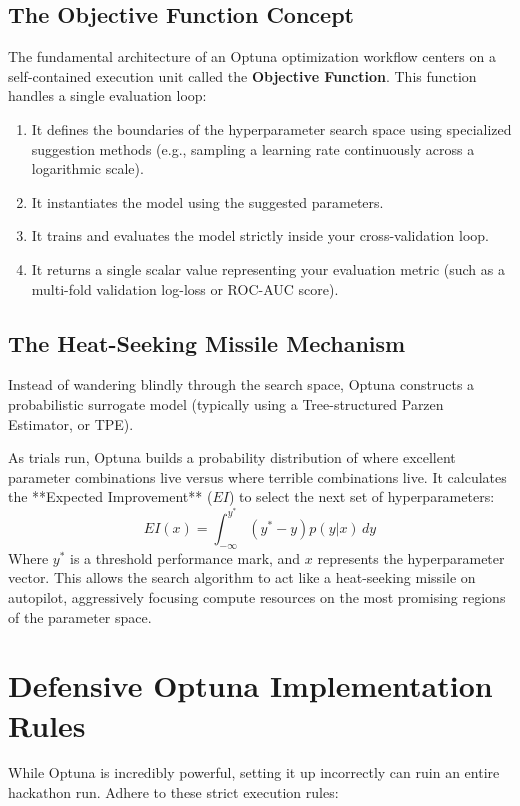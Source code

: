 \documentclass{article}
\begin{document}
\subsection{The Objective Function Concept}
The fundamental architecture of an Optuna optimization workflow centers on a self-contained execution unit called the \textbf{Objective Function}. This function handles a single evaluation loop:
\begin{enumerate}
    \item It defines the boundaries of the hyperparameter search space using specialized suggestion methods (e.g., sampling a learning rate continuously across a logarithmic scale).
    \item It instantiates the model using the suggested parameters.
    \item It trains and evaluates the model strictly inside your cross-validation loop.
    \item It returns a single scalar value representing your evaluation metric (such as a multi-fold validation log-loss or ROC-AUC score).
\end{enumerate}

\subsection{The Heat-Seeking Missile Mechanism}
Instead of wandering blindly through the search space, Optuna constructs a probabilistic surrogate model (typically using a Tree-structured Parzen Estimator, or TPE).

As trials run, Optuna builds a probability distribution of where excellent parameter combinations live versus where terrible combinations live. It calculates the **Expected Improvement** ($EI$) to select the next set of hyperparameters:
\begin{equation}
    EI(x) = \int_{-\infty}^{y^*} (y^* - y) p(y|x) \, dy
\end{equation}
Where $y^*$ is a threshold performance mark, and $x$ represents the hyperparameter vector. This allows the search algorithm to act like a heat-seeking missile on autopilot, aggressively focusing compute resources on the most promising regions of the parameter space.

\section{Defensive Optuna Implementation Rules}
While Optuna is incredibly powerful, setting it up incorrectly can ruin an entire hackathon run. Adhere to these strict execution rules:
\end{document}
